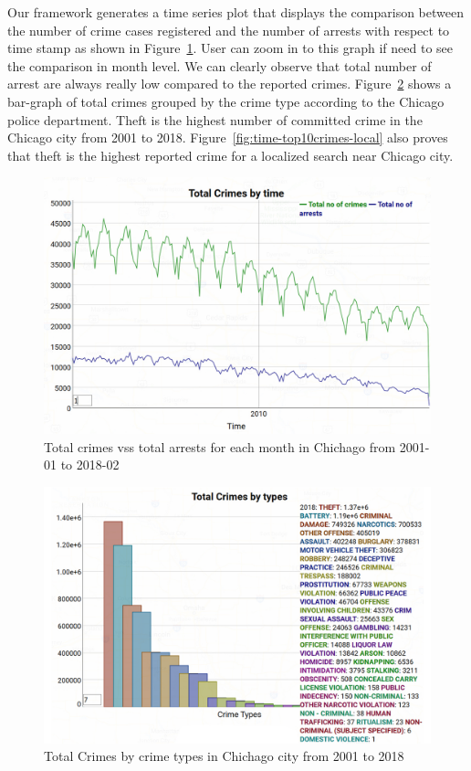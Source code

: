 Our framework generates a time series plot that displays the
comparison between the number of crime cases registered and the number
of arrests with respect to time stamp as shown in
Figure~\ref{fig:time-top10crimes-local-stat1}. User can zoom in to
this graph if need to see the comparison in month level. We can
clearly observe that total number of arrest are always really low
compared to the reported
crimes. Figure~\ref{fig:year-top10crimes-local-stat2} shows a
bar-graph of total crimes grouped by the crime type according to the
Chicago police department. Theft is the highest number of committed
crime in the Chicago city from 2001 to 2018.
Figure~\ref{fig:time-top10crimes-local} also proves that theft is the
highest reported crime for a localized search near Chicago city.

\begin{figure}[htb]
	\centering\includegraphics[width=\columnwidth]{images/stat1.jpg}
	\caption{Total crimes vss total arrests for each month in Chichago
        from 2001-01 to 2018-02}\label{fig:time-top10crimes-local-stat1}
\end{figure}

\begin{figure}[htb]
	\centering\includegraphics[width=\columnwidth]{images/stat2.jpg}
	\caption{Total Crimes by crime types in Chichago city from 2001
        to 2018}\label{fig:year-top10crimes-local-stat2}
\end{figure}

